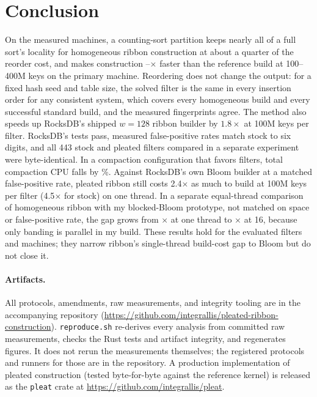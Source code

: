 \documentclass{article}
\newenvironment{acks}{\paragraph*{Artifacts.}}{}
\begin{document}
\section{Conclusion}
On the measured machines, a counting-sort partition keeps nearly all of a full sort's locality for homogeneous ribbon construction at about a quarter of the reorder cost, and makes construction \esevenrefpartcent--\esevenrefpartfour$\times$ faster than the reference build at 100--400M keys on the primary machine. Reordering does not change the output: for a fixed hash seed and table size, the solved filter is the same in every insertion order for any consistent system, which covers every homogeneous build and every successful standard build, and the measured fingerprints agree. The method also speeds up RocksDB's shipped $w=128$ ribbon builder by $1.8\times$ at 100M keys per filter. RocksDB's tests pass, measured false-positive rates match stock to six digits, and all 443 stock and pleated filters compared in a separate experiment were byte-identical. In a compaction configuration that favors filters, total compaction CPU falls by \esevencompreduction\%. Against RocksDB's own Bloom builder at a matched false-positive rate, pleated ribbon still costs 2.4$\times$ as much to build at 100M keys per filter (4.5$\times$ for stock) on one thread. In a separate equal-thread comparison of homogeneous ribbon with my blocked-Bloom prototype, not matched on space or false-positive rate, the gap grows from \efourratioone$\times$ at one thread to \efourratiomax$\times$ at 16, because only banding is parallel in my build. These results hold for the evaluated filters and machines; they narrow ribbon's single-thread build-cost gap to Bloom but do not close it.

\begin{acks}
All protocols, amendments, raw measurements, and integrity tooling are in the accompanying
repository (\url{https://github.com/integrallis/pleated-ribbon-construction}). \texttt{reproduce.sh} re-derives every analysis from committed raw
measurements, checks the Rust tests and artifact integrity, and regenerates figures. It does not
rerun the measurements themselves; the registered protocols and runners for those are in the
repository. A production implementation of pleated construction (tested
byte-for-byte against the reference kernel) is released as the \texttt{pleat} crate at
\url{https://github.com/integrallis/pleat}.
\end{acks}

\end{document}
